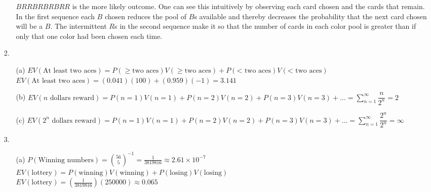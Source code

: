 \documentclass{article}
\begin{document}
\begin{enumerate}
\begin{enumerate}
			$B R R B R B R B R R$ is the more likely outcome. One can see this intuitively by observing each card chosen and the cards that remain. In the first sequence each $B$ chosen reduces the pool of $B$s available and thereby decreases the probability that the next card chosen will be a $B$. The intermittent $R$s in the second sequence make it so that the number of cards in each color pool is greater than if only that one color had been chosen each time. 
	\end{enumerate}

\newpage

\item[2.]
	\begin{enumerate}
	\item[(a)] 
			$EV(\text{At least two aces}) = P(\ge \text{two aces})V(\ge\text{two aces}) + P(\text{< two aces})V(\text{< two aces})$\\
			$EV(\text{At least two aces}) = (0.041)(100) + (0.959)(-1) = 3.141$\\
\bigskip
	\item[(b)] 
			$EV(n \text{ dollars reward}) = P(n=1)V(n=1) + P(n=2)V(n=2) + P(n=3)V(n=3) +... = \displaystyle\sum_{n=1}^{\infty} \dfrac{n}{2^n} = 2$
\bigskip
	\item[(c)] 
			$EV(2^n \text{ dollars reward}) = P(n=1)V(n=1) + P(n=2)V(n=2) + P(n=3)V(n=3) +... = \displaystyle\sum_{n=1}^{\infty} \dfrac{2^n}{2^n} = \infty$
	\end{enumerate}

\bigskip

\item[3.]
	\begin{enumerate}
	\item[(a)] 
			$P(\text{Winning numbers}) = \binom{56}{5}^{-1} = \frac{1}{3819816} \approx 2.61 \times 10^{-7}$\\
			
			$EV(\text{lottery}) = P(\text{winning})V(\text{winning}) + P(\text{losing})V(\text{losing})$\\
			$EV(\text{lottery}) = \left(\frac{1}{3819816}\right)(250000) \approx 0.065$\\
			

\end{enumerate}
\end{enumerate}
\end{document}
